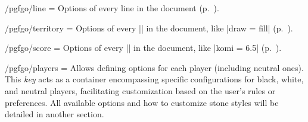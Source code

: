\begin{key}{/pgfgo/line = }
	Options of every line in the document (p.~\pageref{subsec:arrows}).
\end{key}

\begin{key}{/pgfgo/territory = }
	Options of every |\territory| in the document, like |draw = fill| (p.~\pageref{subsec:territory}).
\end{key}

\begin{key}{/pgfgo/score = }
	Options of every |\pgfgoscore| in the document, like |komi = 6.5| (p.~\pageref{subsec:territory}).
\end{key}

\begin{key}{/pgfgo/players = }
	Allows defining options for each player (including neutral ones). This \emph{key} acts as a container encompassing specific configurations for black, white, and neutral players, facilitating customization based on the user's rules or preferences. All available options and how to customize stone styles will be detailed in another section.
\end{key}

\begin{codeexample}[]
	
	\begin{goban}[3]
	\end{goban}
	
	\begin{goban}[4]
	\end{goban}
\end{codeexample}

